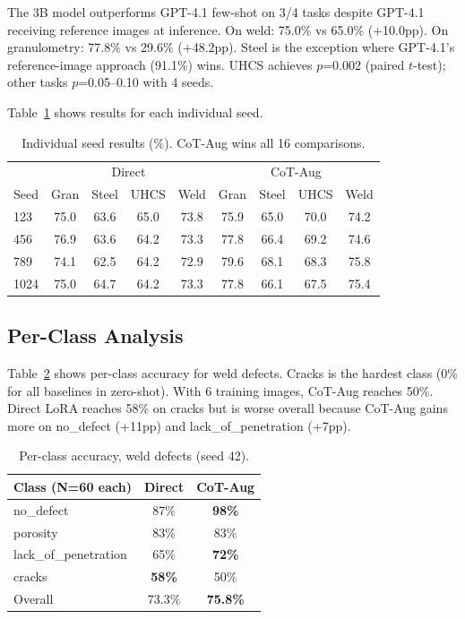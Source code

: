 \documentclass[11pt]{article}
\begin{document}
The 3B model outperforms GPT-4.1 few-shot on 3/4 tasks despite GPT-4.1 receiving reference images at inference. On weld: 75.0\% vs 65.0\% (+10.0pp). On granulometry: 77.8\% vs 29.6\% (+48.2pp). Steel is the exception where GPT-4.1's reference-image approach (91.1\%) wins. UHCS achieves $p$=0.002 (paired $t$-test); other tasks $p$=0.05--0.10 with 4 seeds.

Table~\ref{tab:seeds} shows results for each individual seed.

\begin{table}[h]
\centering\small
\begin{tabular}{l|cccc|cccc}
\toprule
& \multicolumn{4}{c|}{Direct} & \multicolumn{4}{c}{CoT-Aug} \\
Seed & Gran & Steel & UHCS & Weld & Gran & Steel & UHCS & Weld \\
\midrule
123 & 75.0 & 63.6 & 65.0 & 73.8 & 75.9 & 65.0 & 70.0 & 74.2 \\
456 & 76.9 & 63.6 & 64.2 & 73.3 & 77.8 & 66.4 & 69.2 & 74.6 \\
789 & 74.1 & 62.5 & 64.2 & 72.9 & 79.6 & 68.1 & 68.3 & 75.8 \\
1024 & 75.0 & 64.7 & 64.2 & 73.3 & 77.8 & 66.1 & 67.5 & 75.4 \\
\bottomrule
\end{tabular}
\caption{Individual seed results (\%). CoT-Aug wins all 16 comparisons.}
\label{tab:seeds}
\end{table}

\subsection{Per-Class Analysis}

Table~\ref{tab:perclass_weld} shows per-class accuracy for weld defects. Cracks is the hardest class (0\% for all baselines in zero-shot). With 6 training images, CoT-Aug reaches 50\%. Direct LoRA reaches 58\% on cracks but is worse overall because CoT-Aug gains more on no\_defect (+11pp) and lack\_of\_penetration (+7pp).

\begin{table}[h]
\centering\small
\begin{tabular}{lcc}
\toprule
Class (N=60 each) & Direct & CoT-Aug \\
\midrule
no\_defect & 87\% & \textbf{98\%} \\
porosity & 83\% & 83\% \\
lack\_of\_penetration & 65\% & \textbf{72\%} \\
cracks & \textbf{58\%} & 50\% \\
\midrule
Overall & 73.3\% & \textbf{75.8\%} \\
\bottomrule
\end{tabular}
\caption{Per-class accuracy, weld defects (seed 42).}
\label{tab:perclass_weld}
\end{table}
\end{document}
